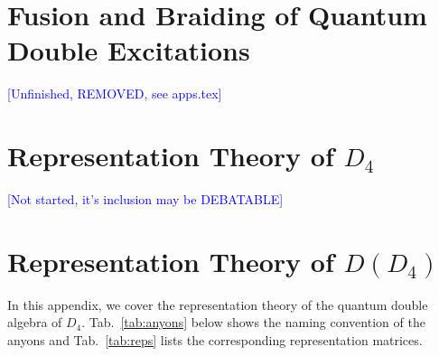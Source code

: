 \documentclass[two column]{article}
\newcommand{\jovan}[1]{\textcolor{blue}{[#1]}}
\begin{document}
\section{Fusion and Braiding of Quantum Double Excitations}\label{app:fusion}\label{app:braid}
\jovan{Unfinished, REMOVED, see apps.tex}

\section{Representation Theory of $D_4$} \label{app:D4asgroup}
\jovan{Not started, it's inclusion may be DEBATABLE}

\section{Representation Theory of $D(D_4)$}\label{app:reps}

In this appendix, we cover the representation theory of the quantum double algebra of $D_4$. Tab.~\ref{tab:anyons} below shows the naming convention of the anyons and Tab.~\ref{tab:reps} lists the corresponding representation matrices.
\end{document}
